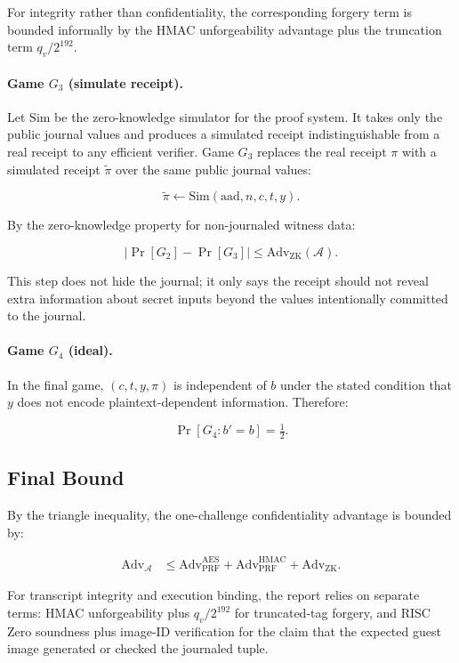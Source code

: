 For integrity rather than confidentiality, the corresponding forgery term is
bounded informally by the HMAC unforgeability advantage plus the truncation term
\(q_v / 2^{192}\).

\paragraph{Game \(G_3\) (simulate receipt).}
Let \(\mathrm{Sim}\) be the zero-knowledge simulator for the proof system. It
takes only the public journal values and produces a simulated receipt
indistinguishable from a real receipt to any efficient verifier. Game \(G_3\)
replaces the real receipt \(\pi\) with a simulated receipt \(\tilde{\pi}\) over
the same public journal values:

\[
\tilde{\pi} \leftarrow \mathrm{Sim}(\mathrm{aad}, n, c, t, y).
\]

By the zero-knowledge property for non-journaled witness data:

\[
|\Pr[G_2] - \Pr[G_3]| \leq
\mathrm{Adv}_{\mathrm{ZK}}(\mathcal{A}).
\]

This step does not hide the journal; it only says the receipt should not reveal
extra information about secret inputs beyond the values intentionally committed
to the journal.

\paragraph{Game \(G_4\) (ideal).}
In the final game, \((c, t, y, \pi)\) is independent of \(b\) under the stated
condition that \(y\) does not encode plaintext-dependent information. Therefore:

\[
\Pr[G_4 : b' = b] = \tfrac{1}{2}.
\]

\subsection{Final Bound}

By the triangle inequality, the one-challenge confidentiality advantage is
bounded by:

\begin{align*}
\mathrm{Adv}_{\mathcal{A}}
&\leq \mathrm{Adv}_{\mathrm{PRF}}^{\mathrm{AES}}
+ \mathrm{Adv}_{\mathrm{PRF}}^{\mathrm{HMAC}}
+ \mathrm{Adv}_{\mathrm{ZK}}.
\end{align*}

For transcript integrity and execution binding, the report relies on separate
terms: HMAC unforgeability plus \(q_v / 2^{192}\) for truncated-tag forgery, and
RISC Zero soundness plus image-ID verification for the claim that the expected
guest image generated or checked the journaled tuple.

